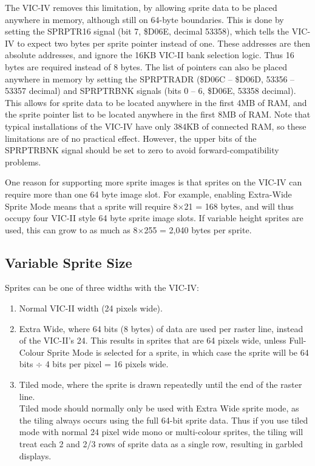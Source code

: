 The VIC-IV removes this limitation, by allowing sprite data to be placed anywhere in memory, although still on 64-byte
boundaries. This is done by setting the SPRPTR16 signal (bit 7, \$D06E, decimal 53358), which tells the VIC-IV to expect
two bytes per sprite pointer instead of one.  These addresses are then absolute addresses, and ignore the 16KB VIC-II
bank selection logic.  Thus 16 bytes are required instead of 8 bytes.  The list of pointers can also be placed anywhere
in memory by setting the SPRPTRADR (\$D06C -- \$D06D, 53356 -- 53357 decimal) and SPRPTRBNK signals (bits 0 -- 6, \$D06E, 53358 decimal).
This allows for sprite data to be located anywhere in the first 4MB of RAM, and the sprite pointer list to be located anywhere
in the first 8MB of RAM.  Note that typical installations of the VIC-IV have only 384KB of connected RAM, so these limitations are
of no practical effect. However, the upper bits of the SPRPTRBNK signal should be set to zero to avoid forward-compatibility
problems.

One reason for supporting more sprite images is that sprites on the VIC-IV can require more than one 64 byte image slot.
For example, enabling Extra-Wide Sprite Mode means that a sprite will require 8$\times$21 = 168 bytes, and will thus occupy
four VIC-II style 64 byte sprite image slots.  If variable height sprites are used, this can grow to as much as  8$\times$255 = 2,040 bytes per sprite.

\subsection{Variable Sprite Size}

Sprites can be one of three widths with the VIC-IV:

\begin{enumerate}
\item Normal VIC-II width (24 pixels wide).
\item Extra Wide, where 64 bits (8 bytes) of data are used per raster line, instead of the VIC-II's 24.
  This results in sprites that are 64 pixels wide, unless Full-Colour Sprite Mode is selected for a sprite,
  in which case the sprite will be 64 bits $\div$ 4 bits per pixel = 16 pixels wide.
\item Tiled mode, where the sprite is drawn repeatedly until the end of the raster line. \\
  Tiled mode should normally only be used with Extra Wide sprite mode, as the tiling always occurs using the full
64-bit sprite data. Thus if you use tiled mode with normal 24 pixel wide mono or multi-colour sprites, the tiling will treat each 2 and 2/3 rows of sprite data as a single row, resulting in garbled displays.
\end{enumerate}

